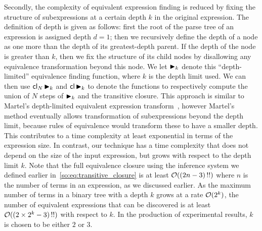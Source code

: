 Secondly, the complexity of equivalent expression finding is reduced by
fixing the structure of subexpressions at a certain depth $k$ in the original
expression.  The definition of depth is given as follows: first the root of
the parse tree of an expression is assigned depth $d = 1$; then we recursively
define the depth of a node as one more than the depth of its greatest-depth
parent.  If the depth of the node is greater than $k$, then we fix the
structure of its child nodes by disallowing any equivalence transformation
beyond this node. We let $\operatorname{\blacktriangleright}_k$ denote this ``depth-limited'' equivalence
finding function, where $k$ is the depth limit used.  We can then use
$\operatorname{\mathsf{cl}}_N \operatorname{\blacktriangleright}_k$ and $\operatorname{\mathsf{cl}} \operatorname{\blacktriangleright}_k$ to denote the functions to
respectively compute the union of $N$ steps of $\operatorname{\blacktriangleright}_k$ and the transitive
closure. This approach is similar to Martel's depth-limited equivalent
expression transform~\cite{martel07}, however Martel's method eventually allows
transformation of subexpressions beyond the depth limit, because rules of
equivalence would transform these to have a smaller depth.  This contributes
to a time complexity at least exponential in terms of the expression size.
In contrast, our technique has a time complexity that does not depend on the
size of the input expression, but grows with respect to the depth limit $k$.
Note that the full equivalence closure using the inference system we defined
earlier in~\eqref{so:eq:transitive_closure} is at least $\operatorname{\mathcal{O}}((2n - 3)\,!!)$
where $n$ is the number of terms in an expression, as we discussed earlier.  As
the maximum number of terms in a binary tree with a depth $k$ grows at a rate
$\operatorname{\mathcal{O}}(2^k)$, the number of equivalent expressions that can be discovered is at
least $\operatorname{\mathcal{O}}((2\times 2^k - 3)\,!!)$ with respect to $k$.  In the production of
experimental results, $k$ is chosen to be either $2$ or $3$.

